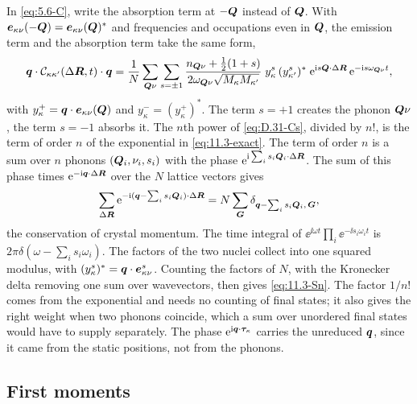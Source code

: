 In \cref{eq:5.6-C}, write the absorption term at $-\bm{Q}$ instead of $\bm{Q}$. With $\bm{e}_{\kappa\nu}(-\bm{Q}) = \bm{e}_{\kappa\nu}(\bm{Q})^*$ and frequencies and occupations even in $\bm{Q}$, the emission term and the absorption term take the same form,
\begin{equation}
  \bm{q}\cdot\mathcal{C}_{\kappa\kappa'}(\Delta\bm{R},t)\cdot\bm{q} = \frac1N\sum_{\bm{Q}\nu}\sum_{s = \pm1}\frac{n_{\bm{Q}\nu} + \frac12(1 + s)}{2\omega_{\bm{Q}\nu}\sqrt{M_\kappa M_{\kappa'}}}\;y^s_{\kappa}\,(y^s_{\kappa'})^*\;\mathrm{e}^{\mathrm{i} s\bm{Q}\cdot\Delta\bm{R}}\,\mathrm{e}^{-\mathrm{i} s\omega_{\bm{Q}\nu}t} ,
  \label{eq:D.31-Cs}
\end{equation}
with $y^{+}_\kappa = \bm{q}\cdot\bm{e}_{\kappa\nu}(\bm{Q})$ and $y^{-}_\kappa = (y^{+}_\kappa)^*$. The term $s = +1$ creates the phonon $\bm{Q}\nu$, the term $s = -1$ absorbs it. The $n$th power of \cref{eq:D.31-Cs}, divided by $n!$, is the term of order $n$ of the exponential in \cref{eq:11.3-exact}. The term of order $n$ is a sum over $n$ phonons $(\bm{Q}_i,\nu_i,s_i)$ with the phase $\mathrm{e}^{\mathrm{i}\sum_is_i\bm{Q}_i\cdot\Delta\bm{R}}$. The sum of this phase times $\mathrm{e}^{-\mathrm{i}\bm{q}\cdot\Delta\bm{R}}$ over the $N$ lattice vectors gives
\begin{equation*}
  \sum_{\Delta\bm{R}}\mathrm{e}^{-\mathrm{i}(\bm{q} - \sum_is_i\bm{Q}_i)\cdot\Delta\bm{R}} = N\sum_{\bm{G}}\delta_{\bm{q} - \sum_is_i\bm{Q}_i,\,\bm{G}} ,
\end{equation*}
the conservation of crystal momentum. The time integral of $\ee^{\ii\omega t}\prod_i\ee^{-\ii s_i\omega_i t}$ is $2\pi\delta(\omega - \sum_is_i\omega_i)$. The factors of the two nuclei collect into one squared modulus, with $(y^{s}_\kappa)^* = \bm{q}\cdot\bm{e}^{s}_{\kappa\nu}$. Counting the factors of $N$, with the Kronecker delta removing one sum over wavevectors, then gives \cref{eq:11.3-Sn}. The factor $1/n!$ comes from the exponential and needs no counting of final states; it also gives the right weight when two phonons coincide, which a sum over unordered final states would have to supply separately. The phase $\mathrm{e}^{\mathrm{i}\bm{q}\cdot\bm{\tau}_\kappa}$ carries the unreduced $\bm{q}$, since it came from the static positions, not from the phonons.

\subsection{First moments}

